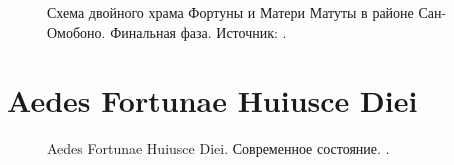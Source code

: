 \begin{appendices}
\begin{figure}[ht!]
\caption{Схема двойного храма Фортуны и Матери Матуты в районе Сан-Омобоно. Финальная фаза. \footnotesize{Источник: \cite[P. 35]{Richardson1992}}. }\label{pic:TwinTemples}
\end{figure}


\section{Aedes Fortunae Huiusce Diei}\label{appendix:FortunaHD}


\begin{figure}[ht!]
\caption{Aedes Fortunae Huiusce Diei. Современное состояние. \footnotesize{}. }\label{pic:FortunaHD}
\end{figure}


\end{appendices}
